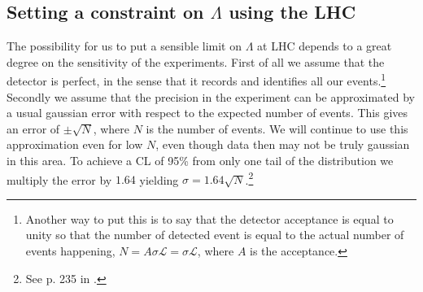 \subsection{Setting a constraint on $\Lambda$ using the LHC}
The possibility for us to put a sensible limit on $\Lambda$ at LHC depends to a great degree on the sensitivity of the experiments. First of all we assume that the detector is perfect, in the sense that it records and identifies all our events.\footnote{Another way to put this is to say that the detector acceptance is equal to unity so that the number of detected event is equal to the actual number of events happening, $N = A\sigma \mathcal{L} = \sigma \mathcal{L}$, where $A$ is the acceptance.} Secondly we assume that the precision in the experiment can be approximated by a usual gaussian error with respect to the expected number of events. This gives an error of $\pm \sqrt{N}$, where $N$ is the number of events. We will continue to use this approximation even for low $N$, even though data then may not be truly gaussian in this area. To achieve a CL of 95\% from only one tail of the distribution we multiply the error by $1.64$ yielding $\sigma = 1.64 \sqrt{N}$.\footnote{See p. 235 in \cite{hagiwara2002rpp}.}
